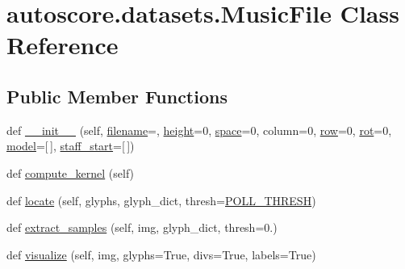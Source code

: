 \hypertarget{classautoscore_1_1datasets_1_1MusicFile}{}\section{autoscore.\+datasets.\+Music\+File Class Reference}
\label{classautoscore_1_1datasets_1_1MusicFile}
\subsection*{Public Member Functions}
\begin{DoxyCompactItemize}
\item 
def \hyperlink{classautoscore_1_1datasets_1_1MusicFile_a6e8b01cb3b1de42c987a6a901ec652df}{\+\_\+\+\_\+init\+\_\+\+\_\+} (self, \hyperlink{classautoscore_1_1datasets_1_1MusicFile_aacc6dc64cbc5fe1e92c6a06edc989afb}{filename}=\textquotesingle{}\textquotesingle{}, \hyperlink{classautoscore_1_1datasets_1_1MusicFile_a9f6580afdca3397f15fe0e60b48a75cc}{height}=0, \hyperlink{classautoscore_1_1datasets_1_1MusicFile_af4e09b923bdd5383d414bb98352aa462}{space}=0, column=0, \hyperlink{classautoscore_1_1datasets_1_1MusicFile_a861933bdc9897aff3416f6462dd1afdf}{row}=0, \hyperlink{classautoscore_1_1datasets_1_1MusicFile_a007db4b9326d26671bcd525eb6844a58}{rot}=0, \hyperlink{classautoscore_1_1datasets_1_1MusicFile_a5ff57ae711407456d3d211797d3c8eb1}{model}=\mbox{[}$\,$\mbox{]}, \hyperlink{classautoscore_1_1datasets_1_1MusicFile_aa0496558ca272cd757c35daf4d790c02}{staff\+\_\+start}=\mbox{[}$\,$\mbox{]})
\item 
def \hyperlink{classautoscore_1_1datasets_1_1MusicFile_ab1101d888b07755b148cae3e5f55d328}{compute\+\_\+kernel} (self)
\item 
def \hyperlink{classautoscore_1_1datasets_1_1MusicFile_ad9edec3f0f3e8d3d365788c8dce5a86b}{locate} (self, glyphs, glyph\+\_\+dict, thresh=\hyperlink{namespaceautoscore_1_1datasets_ae50cb083b87b74755b2e1cd980a87521}{P\+O\+L\+L\+\_\+\+T\+H\+R\+E\+SH})
\item 
def \hyperlink{classautoscore_1_1datasets_1_1MusicFile_a1979d1e68b3cee0de8cb3bf26537e6be}{extract\+\_\+samples} (self, img, glyph\+\_\+dict, thresh=0.)
\item 
def \hyperlink{classautoscore_1_1datasets_1_1MusicFile_a270b7fa17a20dfd1d95137250fb8d663}{visualize} (self, img, glyphs=True, divs=True, labels=True)
\end{DoxyCompactItemize}
